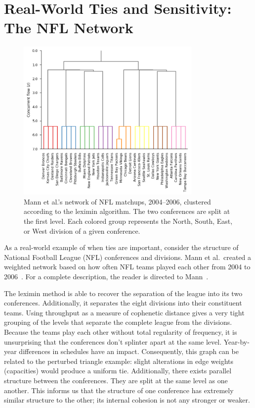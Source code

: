 \section{Real-World Ties and Sensitivity: The NFL Network}

\begin{figure}
\centering
\includegraphics[width=0.8\textwidth]{fig/nfl}
\caption{Mann et al.'s network of NFL matchups, 2004--2006, clustered according to the leximin algorithm. The two conferences are split at the first level. Each colored group represents the North, South, East, or West division of a given conference.}
\label{fig:nfl}
\end{figure}

As a real-world example of when ties are important, consider the structure of National Football League (NFL) conferences and divisions. Mann et al.\ created a weighted network based on how often NFL teams played each other from 2004 to 2006~\cite{mann2008sparsest}. For a complete description, the reader is directed to Mann~\cite{mann2008extensions}.

The leximin method is able to recover the separation of the league into its two conferences. Additionally, it separates the eight divisions into their constituent teams. Using throughput as a measure of cophenetic distance gives a very tight grouping of the levels that separate the complete league from the divisions. Because the teams play each other without total regularity of frequency, it is unsurprising that the conferences don't splinter apart at the same level. Year-by-year differences in schedules have an impact. Consequently, this graph can be related to the perturbed triangle example: slight alterations in edge weights (capacities) would produce a uniform tie. Additionally, there exists parallel structure between the conferences. They are split at the same level as one another. This informs us that the structure of one conference has extremely similar structure to the other; its internal cohesion is not any stronger or weaker.

